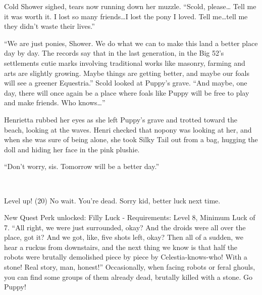 Cold Shower sighed, tears now running down her muzzle. ``Scold, please\dots{} Tell me it was worth it. I lost so many friends\dots I lost the pony I loved. Tell me\dots tell me they didn't waste their lives.''

``We are just ponies, Shower. We do what we can to make this land a better place day by day. The records say that in the last generation, in the Big 52's settlements cutie marks involving traditional works like masonry, farming and arts are slightly growing. Maybe things are getting better, and maybe our foals will see a greener Equestria.'' Scold looked at Puppy's grave. ``And maybe, one day, there will once again be a place where foals like Puppy will be free to play and make friends. Who knows\dots''

Henrietta rubbed her eyes as she left Puppy's grave and trotted toward the beach, looking at the waves. Henri checked that nopony was looking at her, and when she was sure of being alone, she took Silky Tail out from a bag, hugging the doll and hiding her face in the pink plushie. 

``Don't worry, sis. Tomorrow will be a better day.''

\clearpage

~\vfill

\begin{engnote}
		Level up! (20) No wait. You're dead. Sorry kid, better luck next time.
	
		New Quest Perk unlocked: Filly Luck - Requirements: Level 8, Minimum Luck of 7. ``All right, we were just surrounded, okay? And the droids were all over the place, got it? And we got, like, five shots left, okay? Then all of a sudden, we hear a ruckus from downstairs, and the next thing we know is that half the robots were brutally demolished piece by piece by Celestia-knows-who! With a stone! Real story, man, honest!'' Occasionally, when facing robots or feral ghouls, you can find some groups of them already dead, brutally killed with a stone. Go Puppy!
\end{engnote}



